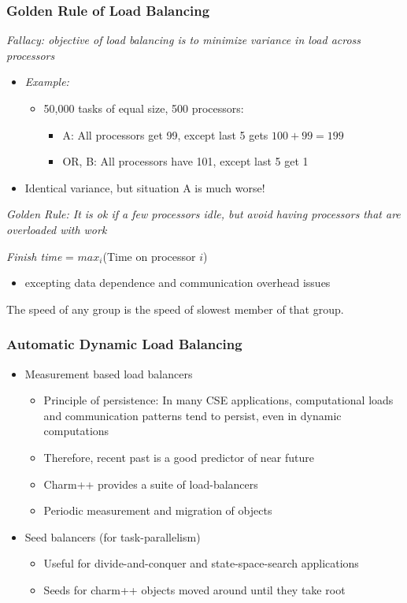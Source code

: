 \begin{frame}[fragile]
\frametitle{Golden Rule of Load Balancing}
\emph{Fallacy: objective of load balancing is to minimize variance in load across processors}

\begin{itemize}
 \item[]\emph{Example:}
 \begin{itemize}
  \item  50,000 tasks of equal size, 500  processors:
  \begin{itemize}
   \item A: All processors get 99, except last 5 gets $100+99 = 199$
   \item OR, B:  All processors have 101, except last 5 get 1
  \end{itemize}
 \end{itemize}
 \item[] Identical variance, but situation A is much worse!
\end{itemize}


\emph{Golden Rule: It is ok if a few processors idle, but avoid having processors that are overloaded with work}


\emph{Finish time} = $max_i$(Time on processor $i$)
\begin{itemize}
\item[] excepting data dependence and communication overhead issues
\end{itemize}

The speed of any group is the speed of slowest member of that group.
\end{frame}

\begin{frame}[fragile]
\frametitle{Automatic Dynamic Load Balancing}
\begin{itemize}
\item Measurement based load balancers
\begin{itemize}
\item Principle of persistence: In many CSE applications, computational loads and communication patterns tend to persist, even in dynamic computations
\item Therefore, recent past is a good predictor of near future
\item Charm++ provides a suite of load-balancers 
\item Periodic measurement and migration of objects
\end{itemize}
\item Seed balancers (for task-parallelism)
\begin{itemize}
\item Useful for divide-and-conquer and state-space-search applications
\item Seeds for charm++ objects moved around until they take root
\end{itemize}
\end{itemize}
\end{frame}

